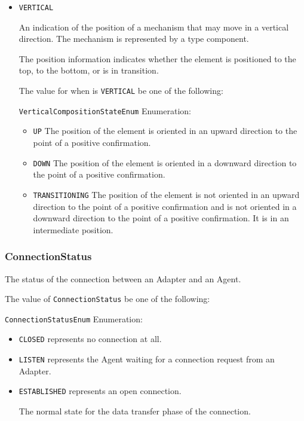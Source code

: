 \begin{itemize}
\item \texttt{VERTICAL}


An indication of the position of a mechanism that may move in a vertical direction. The mechanism is represented by a  type component. 

The position information indicates whether the  element is positioned to the top, to the bottom, or is in transition.


The value for  when  is \texttt{VERTICAL} \MUST be one of the following: 


\texttt{VerticalCompositionStateEnum} Enumeration:

\begin{itemize}
\item \texttt{UP} \newline The position of the  element is oriented in an upward direction to the point of a positive confirmation. 
\item \texttt{DOWN} \newline The position of the  element is oriented in a downward direction to the point of a positive confirmation. 
\item \texttt{TRANSITIONING} \newline The position of the  element is not oriented in an upward direction to the point of a positive confirmation and is not oriented in a downward direction to the point of a positive confirmation. It is in an intermediate position. 
\end{itemize}


\end{itemize}








\subsubsection{ConnectionStatus}
\label{sec:ConnectionStatus}



The status of the connection between an \gls{Adapter} and an \gls{Agent}.


The value of \texttt{ConnectionStatus} \MUST be one of the following: 


\texttt{ConnectionStatusEnum} Enumeration:

\begin{itemize}
\item \texttt{CLOSED} \newline represents no connection at all. 
\item \texttt{LISTEN} \newline represents the \gls{Agent} waiting for a connection request from an \gls{Adapter}. 
\item \texttt{ESTABLISHED} \newline represents an open connection.

The normal state for the data transfer phase of the connection. 
\end{itemize}



